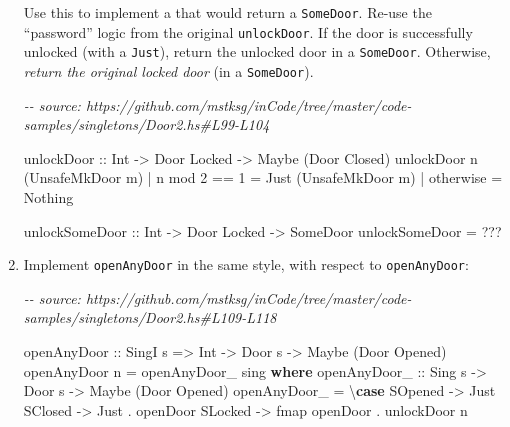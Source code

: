 \documentclass[]{article}
\newenvironment{Shaded}{}{}
\newcommand{\CommentTok}[1]{\textcolor[rgb]{0.38,0.63,0.69}{\textit{#1}}}
\newcommand{\DataTypeTok}[1]{\textcolor[rgb]{0.56,0.13,0.00}{#1}}
\newcommand{\DecValTok}[1]{\textcolor[rgb]{0.25,0.63,0.44}{#1}}
\newcommand{\FunctionTok}[1]{\textcolor[rgb]{0.02,0.16,0.49}{#1}}
\newcommand{\KeywordTok}[1]{\textcolor[rgb]{0.00,0.44,0.13}{\textbf{#1}}}
\newcommand{\NormalTok}[1]{#1}
\newcommand{\OperatorTok}[1]{\textcolor[rgb]{0.40,0.40,0.40}{#1}}
\newcommand{\OtherTok}[1]{\textcolor[rgb]{0.00,0.44,0.13}{#1}}
\begin{document}
\begin{enumerate}
  Use this to implement a that would return a \texttt{SomeDoor}. Re-use the
  ``password'' logic from the original \texttt{unlockDoor}. If the door is
  successfully unlocked (with a \texttt{Just}), return the unlocked door in a
  \texttt{SomeDoor}. Otherwise, \emph{return the original locked door} (in a
  \texttt{SomeDoor}).

\begin{Shaded}
\begin{Highlighting}[]
\CommentTok{{-}{-} source: https://github.com/mstksg/inCode/tree/master/code{-}samples/singletons/Door2.hs\#L99{-}L104}

\OtherTok{unlockDoor ::} \DataTypeTok{Int} \OtherTok{{-}\textgreater{}} \DataTypeTok{Door} \DataTypeTok{\textquotesingle{}Locked} \OtherTok{{-}\textgreater{}} \DataTypeTok{Maybe}\NormalTok{ (}\DataTypeTok{Door} \DataTypeTok{\textquotesingle{}Closed}\NormalTok{)}
\NormalTok{unlockDoor n (}\DataTypeTok{UnsafeMkDoor}\NormalTok{ m)}
    \OperatorTok{|}\NormalTok{ n }\OtherTok{\textasciigrave{}mod\textasciigrave{}} \DecValTok{2} \OperatorTok{==} \DecValTok{1} \OtherTok{=} \DataTypeTok{Just}\NormalTok{ (}\DataTypeTok{UnsafeMkDoor}\NormalTok{ m)}
    \OperatorTok{|} \FunctionTok{otherwise}      \OtherTok{=} \DataTypeTok{Nothing}

\OtherTok{unlockSomeDoor ::} \DataTypeTok{Int} \OtherTok{{-}\textgreater{}} \DataTypeTok{Door} \DataTypeTok{\textquotesingle{}Locked} \OtherTok{{-}\textgreater{}} \DataTypeTok{SomeDoor}
\NormalTok{unlockSomeDoor }\OtherTok{=} \OperatorTok{???}
\end{Highlighting}
\end{Shaded}
\item
  Implement \texttt{openAnyDoor\textquotesingle{}} in the same style, with
  respect to \texttt{openAnyDoor}:

\begin{Shaded}
\begin{Highlighting}[]
\CommentTok{{-}{-} source: https://github.com/mstksg/inCode/tree/master/code{-}samples/singletons/Door2.hs\#L109{-}L118}

\OtherTok{openAnyDoor ::} \DataTypeTok{SingI}\NormalTok{ s }\OtherTok{=\textgreater{}} \DataTypeTok{Int} \OtherTok{{-}\textgreater{}} \DataTypeTok{Door}\NormalTok{ s }\OtherTok{{-}\textgreater{}} \DataTypeTok{Maybe}\NormalTok{ (}\DataTypeTok{Door} \DataTypeTok{\textquotesingle{}Opened}\NormalTok{)}
\NormalTok{openAnyDoor n }\OtherTok{=}\NormalTok{ openAnyDoor\_ sing}
  \KeywordTok{where}
\OtherTok{    openAnyDoor\_ ::} \DataTypeTok{Sing}\NormalTok{ s }\OtherTok{{-}\textgreater{}} \DataTypeTok{Door}\NormalTok{ s }\OtherTok{{-}\textgreater{}} \DataTypeTok{Maybe}\NormalTok{ (}\DataTypeTok{Door} \DataTypeTok{\textquotesingle{}Opened}\NormalTok{)}
\NormalTok{    openAnyDoor\_ }\OtherTok{=}\NormalTok{ \textbackslash{}}\KeywordTok{case}
      \DataTypeTok{SOpened} \OtherTok{{-}\textgreater{}} \DataTypeTok{Just}
      \DataTypeTok{SClosed} \OtherTok{{-}\textgreater{}} \DataTypeTok{Just} \OperatorTok{.}\NormalTok{ openDoor}
      \DataTypeTok{SLocked} \OtherTok{{-}\textgreater{}} \FunctionTok{fmap}\NormalTok{ openDoor }\OperatorTok{.}\NormalTok{ unlockDoor n}


\end{Highlighting}
\end{Shaded}
\end{enumerate}
\end{document}
